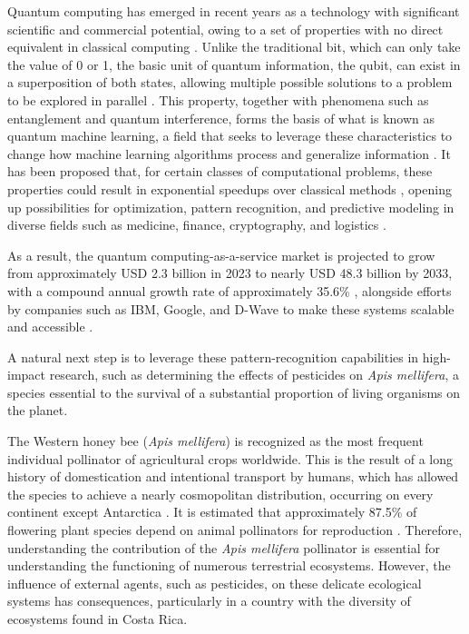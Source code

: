 \documentclass[conference]{IEEEtran}
\begin{document}
Quantum computing has emerged in recent years as a technology with significant scientific and commercial potential, owing to a set of properties with no direct equivalent in classical computing \cite{quamtum}. Unlike the traditional bit, which can only take the value of 0 or 1, the basic unit of quantum information, the qubit, can exist in a superposition of both states, allowing multiple possible solutions to a problem to be explored in parallel \cite{quamtum}. This property, together with phenomena such as entanglement and quantum interference, forms the basis of what is known as quantum machine learning, a field that seeks to leverage these characteristics to change how machine learning algorithms process and generalize information \cite{quamtum}. It has been proposed that, for certain classes of computational problems, these properties could result in exponential speedups over classical methods \cite{quamtum}, opening up possibilities for optimization, pattern recognition, and predictive modeling in diverse fields such as medicine, finance, cryptography, and logistics \cite{quamtum}.

As a result, the quantum computing-as-a-service market is projected to grow from approximately USD 2.3 billion in 2023 to nearly USD 48.3 billion by 2033, with a compound annual growth rate of approximately 35.6\% \cite{quamtum}, alongside efforts by companies such as IBM, Google, and D-Wave to make these systems scalable and accessible \cite{quamtum}.

A natural next step is to leverage these pattern-recognition capabilities in high-impact research, such as determining the effects of pesticides on \textit{Apis mellifera}, a species essential to the survival of a substantial proportion of living organisms on the planet.

The Western honey bee (\textit{Apis mellifera}) is recognized as the most frequent individual pollinator of agricultural crops worldwide. This is the result of a long history of domestication and intentional transport by humans, which has allowed the species to achieve a nearly cosmopolitan distribution, occurring on every continent except Antarctica \cite{abejas}. It is estimated that approximately 87.5\% of flowering plant species depend on animal pollinators for reproduction \cite{abejas}. Therefore, understanding the contribution of the \textit{Apis mellifera} pollinator is essential for understanding the functioning of numerous terrestrial ecosystems. However, the influence of external agents, such as pesticides, on these delicate ecological systems has consequences, particularly in a country with the diversity of ecosystems found in Costa Rica.
\end{document}
